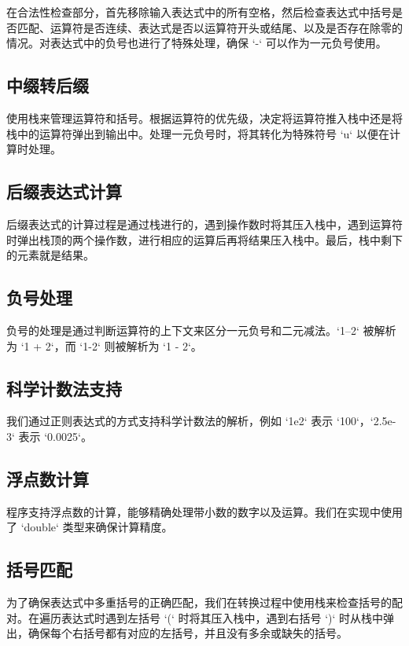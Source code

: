 \documentclass{article}
\begin{document}
在合法性检查部分，首先移除输入表达式中的所有空格，然后检查表达式中括号是否匹配、运算符是否连续、表达式是否以运算符开头或结尾、以及是否存在除零的情况。对表达式中的负号也进行了特殊处理，确保 `-` 可以作为一元负号使用。

\subsection{中缀转后缀}

使用栈来管理运算符和括号。根据运算符的优先级，决定将运算符推入栈中还是将栈中的运算符弹出到输出中。处理一元负号时，将其转化为特殊符号 `u` 以便在计算时处理。

\subsection{后缀表达式计算}

后缀表达式的计算过程是通过栈进行的，遇到操作数时将其压入栈中，遇到运算符时弹出栈顶的两个操作数，进行相应的运算后再将结果压入栈中。最后，栈中剩下的元素就是结果。

\subsection{负号处理}

负号的处理是通过判断运算符的上下文来区分一元负号和二元减法。`1--2` 被解析为 `1 + 2`，而 `1-2` 则被解析为 `1 - 2`。

\subsection{科学计数法支持}

我们通过正则表达式的方式支持科学计数法的解析，例如 `1e2` 表示 `100`，`2.5e-3` 表示 `0.0025`。

\subsection{浮点数计算}

程序支持浮点数的计算，能够精确处理带小数的数字以及运算。我们在实现中使用了 `double` 类型来确保计算精度。

\subsection{括号匹配}

为了确保表达式中多重括号的正确匹配，我们在转换过程中使用栈来检查括号的配对。在遍历表达式时遇到左括号 `(` 时将其压入栈中，遇到右括号 `)` 时从栈中弹出，确保每个右括号都有对应的左括号，并且没有多余或缺失的括号。
\end{document}
